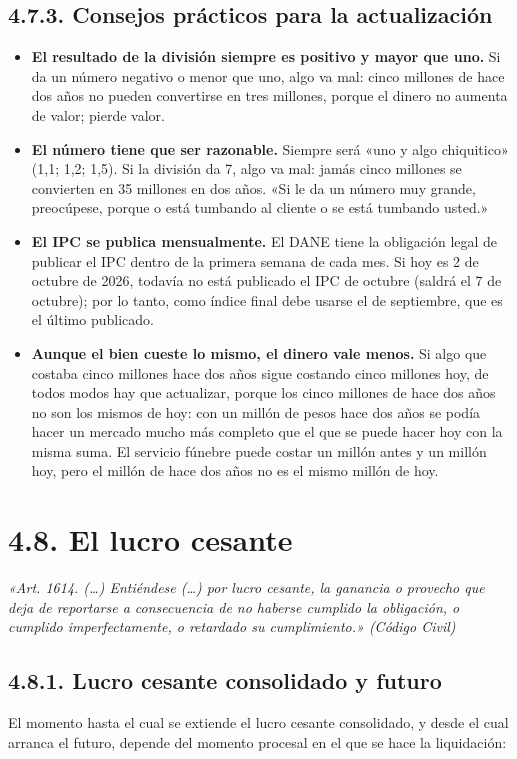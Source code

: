 \subsection{4.7.3. Consejos prácticos para la actualización}
\begin{itemize}
\item \textbf{El resultado de la división siempre es positivo y mayor que uno.} Si da un número negativo o menor que uno, algo va mal: cinco millones de hace dos años no pueden convertirse en tres millones, porque el dinero no aumenta de valor; pierde valor.
\item \textbf{El número tiene que ser razonable.} Siempre será «uno y algo chiquitico» (1,1; 1,2; 1,5). Si la división da 7, algo va mal: jamás cinco millones se convierten en 35 millones en dos años. «Si le da un número muy grande, preocúpese, porque o está tumbando al cliente o se está tumbando usted.»
\item \textbf{El IPC se publica mensualmente.} El DANE tiene la obligación legal de publicar el IPC dentro de la primera semana de cada mes. Si hoy es 2 de octubre de 2026, todavía no está publicado el IPC de octubre (saldrá el 7 de octubre); por lo tanto, como índice final debe usarse el de septiembre, que es el último publicado.
\item \textbf{Aunque el bien cueste lo mismo, el dinero vale menos.} Si algo que costaba cinco millones hace dos años sigue costando cinco millones hoy, de todos modos hay que actualizar, porque los cinco millones de hace dos años no son los mismos de hoy: con un millón de pesos hace dos años se podía hacer un mercado mucho más completo que el que se puede hacer hoy con la misma suma. El servicio fúnebre puede costar un millón antes y un millón hoy, pero el millón de hace dos años no es el mismo millón de hoy.
\end{itemize}
\section{4.8. El lucro cesante}
\begin{cita}
\textit{«Art. 1614. (…) Entiéndese (…) por lucro cesante, la ganancia o provecho que deja de reportarse a consecuencia de no haberse cumplido la obligación, o cumplido imperfectamente, o retardado su cumplimiento.» (Código Civil)}
\end{cita}
\subsection{4.8.1. Lucro cesante consolidado y futuro}
El momento hasta el cual se extiende el lucro cesante consolidado, y desde el cual arranca el futuro, depende del momento procesal en el que se hace la liquidación:


